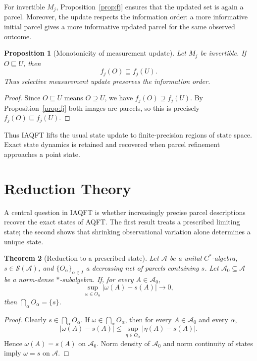 \documentclass[11pt]{article}
\newtheorem{theorem}{Theorem}[section]
\newtheorem{proposition}[theorem]{Proposition}
\newcommand{\A}{\mathcal{A}}
\begin{document}
For invertible $M_j$, Proposition~\ref{prop:fj} ensures that the updated
set is again a parcel. Moreover, the update respects the information
order: a more informative initial parcel gives a more informative updated
parcel for the same observed outcome.
\begin{proposition}[Monotonicity of measurement update]
\label{prop:update-monotone}
Let $M_j$ be invertible. If $O\sqsubseteq U$, then
\[
f_j(O)\sqsubseteq f_j(U).
\]
Thus selective measurement update preserves the information order.
\end{proposition}

\begin{proof}
Since $O\sqsubseteq U$ means $O\supseteq U$, we have
$f_j(O)\supseteq f_j(U)$. By Proposition~\ref{prop:fj} both images are
parcels, so this is precisely $f_j(O)\sqsubseteq f_j(U)$.
\end{proof}

Thus IAQFT lifts the usual state update to finite-precision regions of
state space. Exact state dynamics is retained and recovered when parcel
refinement approaches a point state.
\section{Reduction Theory}\label{sec:reduction}

A central question in IAQFT is whether increasingly precise parcel
descriptions recover the exact states of AQFT. The first result treats a
prescribed limiting state; the second shows that shrinking observational
variation alone determines a unique state.

\begin{theorem}[Reduction to a prescribed state]
\label{thm:prescribedstate}
Let $\A$ be a unital $C^*$-algebra, $s\in\mathcal S(\A)$, and
$\{O_\alpha\}_{\alpha\in I}$ a decreasing net of parcels containing $s$.
Let $\A_0\subseteq\A$ be a norm-dense $*$-subalgebra. If, for every
$A\in\A_0$,
\[
\sup_{\omega\in O_\alpha}|\omega(A)-s(A)|\longrightarrow0,
\]
then $\bigcap_\alpha O_\alpha=\{s\}$.
\end{theorem}

\begin{proof}
Clearly $s\in\bigcap_\alpha O_\alpha$. If
$\omega\in\bigcap_\alpha O_\alpha$, then for every $A\in\A_0$ and every
$\alpha$,
\[
|\omega(A)-s(A)|
\leq
\sup_{\eta\in O_\alpha}|\eta(A)-s(A)|.
\]
Hence $\omega(A)=s(A)$ on $\A_0$. Norm density of $\A_0$ and norm
continuity of states imply $\omega=s$ on $\A$.
\end{proof}
\end{document}
